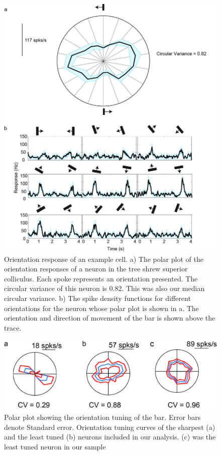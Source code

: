 \documentclass [12pt]{report}
\begin{document}
	\begin{figure}
		
		\includegraphics[width=\linewidth]{SCOriResp.jpg}
		\caption{Orientation response of an example cell. a) The polar plot of the orientation responses of a neuron in the tree shrew superior colliculus. Each spoke represents an orientation presented. The circular variance of this neuron is 0.82. This was also our median circular variance. b) The spike density functions for different orientations for the neuron whose polar plot is shown in a. The orientation and direction of movement of the bar is shown above the trace.}
		\label{fig:fig2}
	\end{figure}
	
	
	\begin{figure}
		\includegraphics[width=\linewidth]{rangeoritun.jpg}
		\caption{Polar plot showing
			the orientation tuning of the bar. Error bars denote
			Standard error. Orientation tuning curves of the
			sharpest (a) and the least tuned (b) neurons
			included in our analysis. (c) was the least tuned
			neuron in our sample}
		\label{fig:fig3}			
	\end{figure}
	
\end{document}

